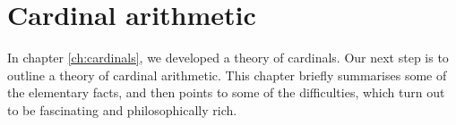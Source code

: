 \documentclass[../../../include/open-logic-chapter]{subfiles}
\begin{document}
\chapter{Cardinal arithmetic}\label{ch:card-arithmetic}
In chapter \ref{ch:cardinals}, we developed a theory of cardinals. Our next step is to outline a theory of cardinal arithmetic. This chapter briefly summarises some of the elementary facts, and then points to some of the difficulties, which turn out to be fascinating and philosophically rich.


\OLEndChapterHook
\end{document}
